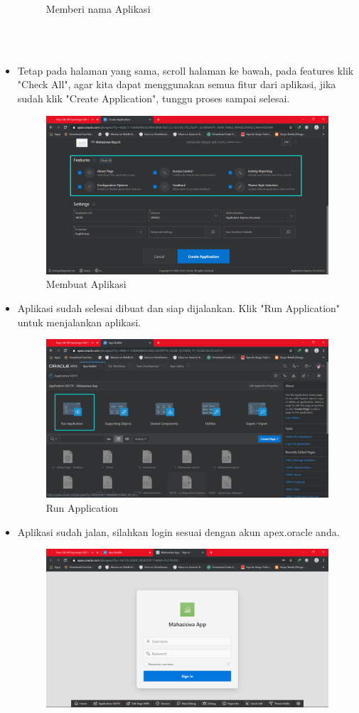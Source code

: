 \documentclass[12pt, times new roman]{article}
\begin{document}
\begin{itemize}
\begin{figure}[htbp]
	\caption{Memberi nama Aplikasi}
\end{figure}\\
\\
\item Tetap pada halaman yang sama, scroll halaman ke bawah, pada features klik "Check All", agar kita dapat menggunakan semua fitur dari aplikasi, jika sudah klik "Create Application", tunggu proses sampai selesai.
\begin{figure}[htbp]
	\centering
	\includegraphics[width=10.5cm]{figures/25.png}
	\caption{Membuat Aplikasi}
\end{figure}
\item Aplikasi sudah selesai dibuat dan siap dijalankan. Klik "Run Application" untuk menjalankan aplikasi.
\begin{figure}[htbp]
	\centering
	\includegraphics[width=10.5cm]{figures/26.png}
	\caption{Run Application}
\end{figure}
\item Aplikasi sudah jalan, silahkan login sesuai dengan akun apex.oracle anda.
\begin{figure}[htbp]
	\centering
	\includegraphics[width=10.5cm]{figures/27.png}

\end{figure}
\end{itemize}
\end{document}
